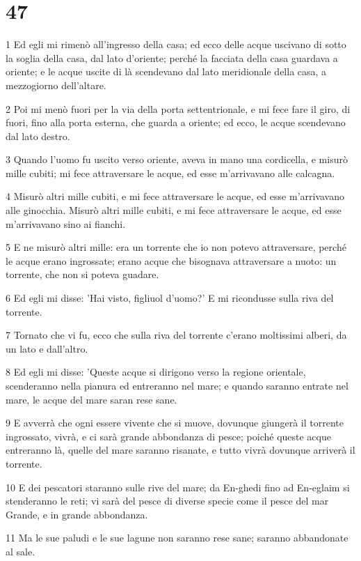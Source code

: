 \chapter{47}

\par 1 Ed egli mi rimenò all'ingresso della casa; ed ecco delle acque uscivano di sotto la soglia della casa, dal lato d'oriente; perché la facciata della casa guardava a oriente; e le acque uscite di là scendevano dal lato meridionale della casa, a mezzogiorno dell'altare.
\par 2 Poi mi menò fuori per la via della porta settentrionale, e mi fece fare il giro, di fuori, fino alla porta esterna, che guarda a oriente; ed ecco, le acque scendevano dal lato destro.
\par 3 Quando l'uomo fu uscito verso oriente, aveva in mano una cordicella, e misurò mille cubiti; mi fece attraversare le acque, ed esse m'arrivavano alle calcagna.
\par 4 Misurò altri mille cubiti, e mi fece attraversare le acque, ed esse m'arrivavano alle ginocchia. Misurò altri mille cubiti, e mi fece attraversare le acque, ed esse m'arrivavano sino ai fianchi.
\par 5 E ne misurò altri mille: era un torrente che io non potevo attraversare, perché le acque erano ingrossate; erano acque che bisognava attraversare a nuoto: un torrente, che non si poteva guadare.
\par 6 Ed egli mi disse: 'Hai visto, figliuol d'uomo?' E mi ricondusse sulla riva del torrente.
\par 7 Tornato che vi fu, ecco che sulla riva del torrente c'erano moltissimi alberi, da un lato e dall'altro.
\par 8 Ed egli mi disse: 'Queste acque si dirigono verso la regione orientale, scenderanno nella pianura ed entreranno nel mare; e quando saranno entrate nel mare, le acque del mare saran rese sane.
\par 9 E avverrà che ogni essere vivente che si muove, dovunque giungerà il torrente ingrossato, vivrà, e ci sarà grande abbondanza di pesce; poiché queste acque entreranno là, quelle del mare saranno risanate, e tutto vivrà dovunque arriverà il torrente.
\par 10 E dei pescatori staranno sulle rive del mare; da En-ghedi fino ad En-eglaim si stenderanno le reti; vi sarà del pesce di diverse specie come il pesce del mar Grande, e in grande abbondanza.
\par 11 Ma le sue paludi e le sue lagune non saranno rese sane; saranno abbandonate al sale.
